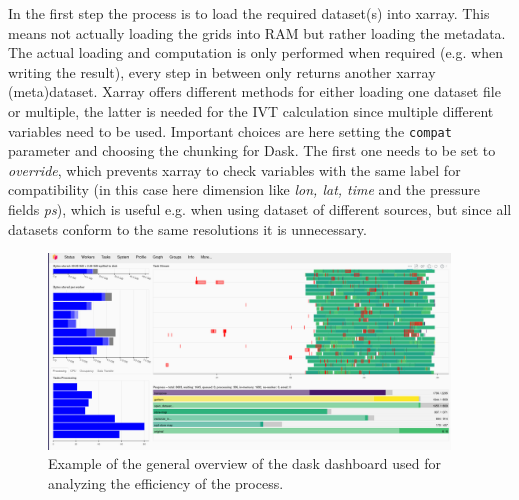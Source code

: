 In the first step the process is to load the required dataset(s) into xarray. 
This means not actually loading the grids into RAM but rather loading the metadata. 
The actual loading and computation is only performed when required (e.g. when writing the result), every step in between only returns another xarray (meta)dataset. 
Xarray offers different methods for either loading one dataset file or multiple, the latter is needed for the IVT calculation since multiple different variables need to be used. 
Important choices are here setting the \texttt{compat} parameter and choosing the chunking for Dask. 
The first one needs to be set to \textit{override}, which prevents xarray to check variables with the same label for compatibility (in this case here dimension like \textit{lon, lat, time} and the pressure fields \textit{ps}), which is useful e.g. when using dataset of different sources, but since all datasets conform to the same resolutions it is unnecessary. 

\begin{figure}[htb]
  \begin{center}
    \includegraphics[width=0.95\textwidth]{figures/dask_dashboard_example.png}
  \end{center}
  \caption{Example of the general overview of the dask dashboard used for analyzing the efficiency of the process.}
  \label{fig:dask-dashboard}
\end{figure}


